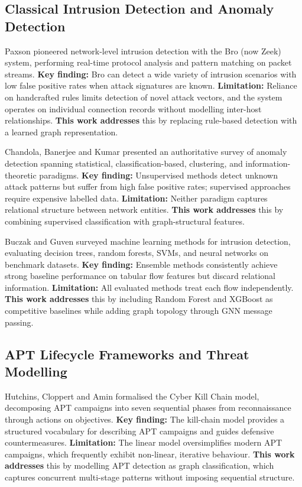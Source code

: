 \documentclass[conference]{IEEEtran}
\begin{document}
\subsection{Classical Intrusion Detection and Anomaly Detection}

Paxson \cite{paxson1999} pioneered network-level intrusion detection with the
Bro (now Zeek) system, performing real-time protocol analysis and pattern
matching on packet streams. \textbf{Key finding:} Bro can detect a wide variety
of intrusion scenarios with low false positive rates when attack signatures are
known. \textbf{Limitation:} Reliance on handcrafted rules limits detection of
novel attack vectors, and the system operates on individual connection records
without modelling inter-host relationships. \textbf{This work addresses} this
by replacing rule-based detection with a learned graph representation.

Chandola, Banerjee and Kumar \cite{chandola2009} presented an authoritative
survey of anomaly detection spanning statistical, classification-based,
clustering, and information-theoretic paradigms. \textbf{Key finding:}
Unsupervised methods detect unknown attack patterns but suffer from high false
positive rates; supervised approaches require expensive labelled data.
\textbf{Limitation:} Neither paradigm captures relational structure between
network entities. \textbf{This work addresses} this by combining supervised
classification with graph-structural features.

Buczak and Guven \cite{buczak2016} surveyed machine learning methods for
intrusion detection, evaluating decision trees, random forests, SVMs, and neural
networks on benchmark datasets. \textbf{Key finding:} Ensemble methods
consistently achieve strong baseline performance on tabular flow features but
discard relational information. \textbf{Limitation:} All evaluated methods
treat each flow independently. \textbf{This work addresses} this by including
Random Forest and XGBoost as competitive baselines while adding graph topology
through GNN message passing.

\subsection{APT Lifecycle Frameworks and Threat Modelling}

Hutchins, Cloppert and Amin \cite{hutchins2011} formalised the Cyber Kill Chain
model, decomposing APT campaigns into seven sequential phases from
reconnaissance through actions on objectives. \textbf{Key finding:} The
kill-chain model provides a structured vocabulary for describing APT campaigns
and guides defensive countermeasures. \textbf{Limitation:} The linear model
oversimplifies modern APT campaigns, which frequently exhibit non-linear,
iterative behaviour. \textbf{This work addresses} this by modelling APT
detection as graph classification, which captures concurrent multi-stage
patterns without imposing sequential structure.
\end{document}
